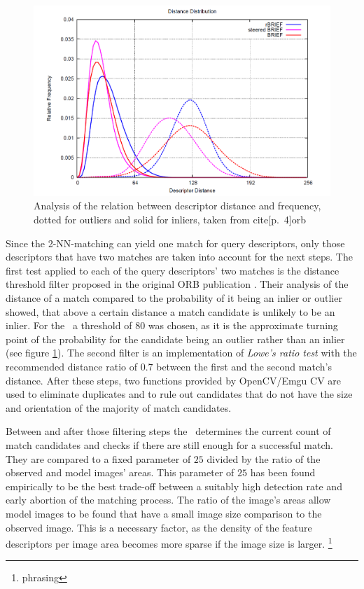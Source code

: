 \begin{figure}[h!]
	\centering
	\includegraphics[scale=0.2]{fig/distance_threshold_orb.png}
	\caption{Analysis of the relation between descriptor distance and frequency, dotted for outliers and solid for inliers, taken from cite[p.~4]{orb}}\label{fig:dist-thresh}
\end{figure}

Since the 2-NN-matching can yield one match for query descriptors, only those descriptors that have two matches are taken into account for the next steps. The first test applied to each of the query descriptors' two matches is the distance threshold filter proposed in the original ORB publication \cite{orb}. Their analysis of the distance of a match compared to the probability of it being an inlier or outlier showed, that above a certain distance a match candidate is unlikely to be an inlier. For the \vd~a threshold of $80$ was chosen, as it is the approximate turning point of the probability for the candidate being an outlier rather than an inlier (see figure \ref{fig:dist-thresh}). The second filter is an implementation of \emph{Lowe's ratio test} \cite{lowes_ratio} with the recommended distance ratio of $0.7$ between the first and the second match's distance. After these steps, two functions provided by OpenCV/Emgu CV are used to eliminate duplicates and to rule out candidates that do not have the size and orientation of the majority of match candidates.

Between and after those filtering steps the \vd~determines the current count of match candidates and checks if there are still enough for a successful match. They are compared to a fixed parameter of $25$ divided by the ratio of the observed and model images' areas. This parameter of $25$ has been found empirically to be the best trade-off between a suitably high detection rate and early abortion of the matching process. The ratio of the image's areas allow model images to be found that have a small image size comparison to the observed image. This is a necessary factor, as the density of the feature descriptors per image area becomes more sparse if the image size is larger. \footnote{phrasing}

